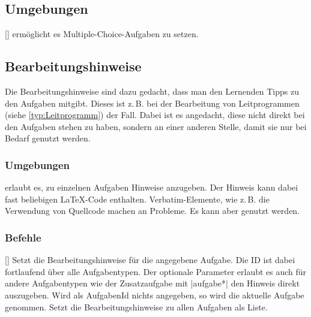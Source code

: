 \subsection{Umgebungen}
    \begin{environments}
        [] ermöglicht es Multiple-Choice-Aufgaben zu setzen.
    \end{environments}

\subsection{Bearbeitungshinweise}
Die Bearbeitungshinweise sind dazu gedacht, dass man den Lernenden Tipps zu den Aufgaben mitgibt. Dieses ist z.\,B. bei der Bearbeitung von Leitprogrammen (siehe \ref{typ:Leitprogramm}) der Fall. Dabei ist es angedacht, diese nicht direkt bei den Aufgaben stehen zu haben, sondern an einer anderen Stelle, damit sie nur bei Bedarf genutzt werden.

\subsubsection{Umgebungen}
\begin{environments}
     erlaubt es, zu einzelnen Aufgaben Hinweise anzugeben. Der Hinweis kann dabei fast beliebigen \LaTeX-Code enthalten. Verbatim-Elemente, wie z.\,B. die Verwendung von Quellcode machen an Probleme. Es kann aber  genutzt werden.
\end{environments}

\subsubsection{Befehle}
\begin{commands}
    [] Setzt die Bearbeitungshinweise für die angegebene Aufgabe. Die ID ist dabei fortlaufend über alle Aufgabentypen. Der optionale Parameter erlaubt es auch für andere Aufgabentypen wie der Zusatzaufgabe mit \verbcode|aufgabe*| den Hinweis direkt auszugeben. Wird als AufgabenId nichts angegeben, so wird die aktuelle Aufgabe genommen.
     Setzt die Bearbeitungshinweise zu allen Aufgaben als Liste.
\end{commands}